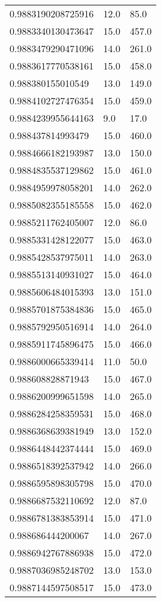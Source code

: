 \begin{center}
\begin{supertabular}[H]{p{0.30\textwidth}p{0.05\textwidth}p{0.05\textwidth}}
0.9883190208725916 & 12.0 & 85.0 \\ 
0.9883340130473647 & 15.0 & 457.0 \\ 
0.9883479290471096 & 14.0 & 261.0 \\ 
0.9883617770538161 & 15.0 & 458.0 \\ 
0.988380155010549 & 13.0 & 149.0 \\ 
0.9884102727476354 & 15.0 & 459.0 \\ 
0.9884239955644163 & 9.0 & 17.0 \\ 
0.988437814993479 & 15.0 & 460.0 \\ 
0.9884666182193987 & 13.0 & 150.0 \\ 
0.9884835537129862 & 15.0 & 461.0 \\ 
0.9884959978058201 & 14.0 & 262.0 \\ 
0.9885082355185558 & 15.0 & 462.0 \\ 
0.9885211762405007 & 12.0 & 86.0 \\ 
0.9885331428122077 & 15.0 & 463.0 \\ 
0.9885428537975011 & 14.0 & 263.0 \\ 
0.9885513140931027 & 15.0 & 464.0 \\ 
0.9885606484015393 & 13.0 & 151.0 \\ 
0.9885701875384836 & 15.0 & 465.0 \\ 
0.9885792950516914 & 14.0 & 264.0 \\ 
0.9885911745896475 & 15.0 & 466.0 \\ 
0.9886000665339414 & 11.0 & 50.0 \\ 
0.988608828871943 & 15.0 & 467.0 \\ 
0.9886200999651598 & 14.0 & 265.0 \\ 
0.9886284258359531 & 15.0 & 468.0 \\ 
0.9886368639381949 & 13.0 & 152.0 \\ 
0.9886448442374444 & 15.0 & 469.0 \\ 
0.9886518392537942 & 14.0 & 266.0 \\ 
0.9886595898305798 & 15.0 & 470.0 \\ 
0.9886687532110692 & 12.0 & 87.0 \\ 
0.9886781383853914 & 15.0 & 471.0 \\ 
0.988686444200067 & 14.0 & 267.0 \\ 
0.9886942767886938 & 15.0 & 472.0 \\ 
0.9887036985248702 & 13.0 & 153.0 \\ 
0.9887144597508517 & 15.0 & 473.0 \\ 

\end{supertabular}
\end{center}

